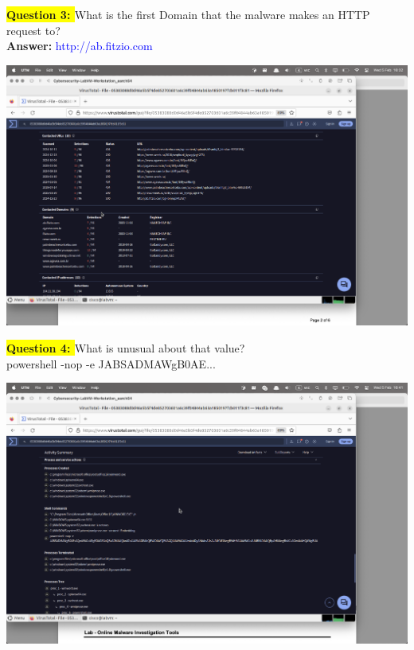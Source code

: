 \documentclass{article}
\begin{document}
\vspace{2\baselineskip}

\textbf{\colorbox{yellow}{Question 3: }} What is the first Domain that the malware makes an HTTP request to? \\
\textbf{Answer: } \textcolor{blue}{http://ab.fitzio.com}

\vspace{1\baselineskip}

\includegraphics[width=1\textwidth]{4.png}

\vspace{1\baselineskip}

\textbf{\colorbox{yellow}{Question 4: }} What is unusual about that value? \\
powershell -nop -e JABSADMAWgB0AE...

\vspace{1\baselineskip}

\includegraphics[width=1\textwidth]{5.png}
\end{document}
